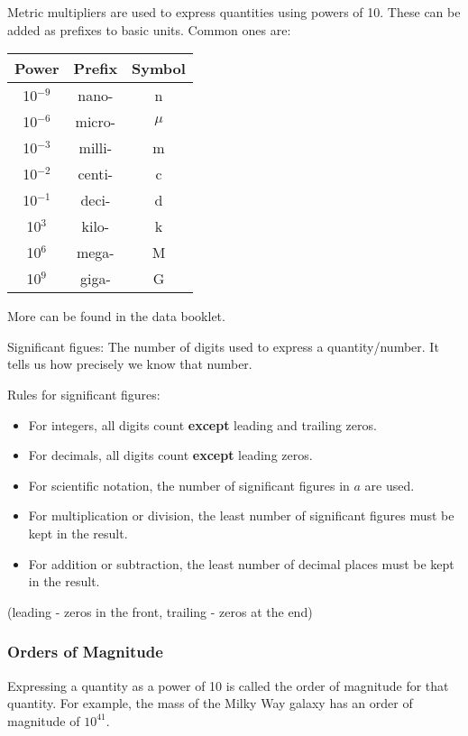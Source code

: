 Metric multipliers are used to express quantities using powers of 10. These
can be added as prefixes to basic units. Common ones are:
\begin{center}
    \begin{tabular}{ |c|c|c| }
        \hline
        \textbf{Power} & \textbf{Prefix} & \textbf{Symbol} \\
        \hline
        10$^{-9}$      & nano-           & n \\
        10$^{-6}$      & micro-          & $\mu$ \\
        10$^{-3}$      & milli-          & m \\
        10$^{-2}$      & centi-          & c \\
        10$^{-1}$      & deci-           & d \\
        10$^3$         & kilo-           & k \\
        10$^6$         & mega-           & M \\
        10$^9$         & giga-           & G \\
        \hline
    \end{tabular}
\end{center}
More can be found in the data booklet.

Significant figues: The number of digits used to express a quantity/number. It
tells us how precisely we know that number.

Rules for significant figures:
\begin{itemize}
    \item For integers, all digits count \textbf{except} leading and trailing
        zeros.
    \item For decimals, all digits count \textbf{except} leading zeros.
    \item For scientific notation, the number of significant figures in $a$
        are used.
    \item For multiplication or division, the least number of significant
        figures must be kept in the result.
    \item For addition or subtraction, the least number of decimal places must
        be kept in the result.
\end{itemize}
{\small (leading - zeros in the front, trailing - zeros at the end)}

\subsubsection{Orders of Magnitude}
Expressing a quantity as a power of 10 is called the order of magnitude for
that quantity. For example, the mass of the Milky Way galaxy has an order of
magnitude of $10^{41}$.

